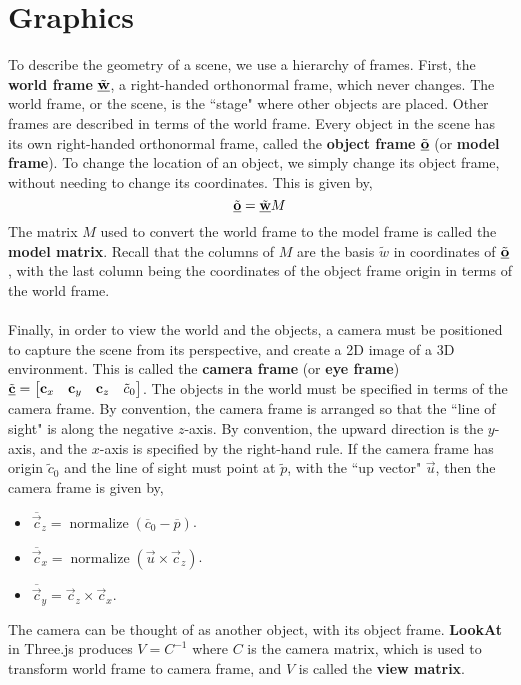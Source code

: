 \documentclass[letterpaper,12pt]{article}
\begin{document}
\section*{Graphics}
To describe the geometry of a scene, we use a hierarchy of frames. First, the \textbf{world frame} $\tilde{\underline{\mathbf{w}}}$, a right-handed orthonormal frame, which never changes. The world frame, or the scene, is the ``stage" where other objects are placed. Other frames are described in terms of the world frame. Every object in the scene has its own right-handed orthonormal frame, called the \textbf{object frame} $\tilde{\underline{\mathbf{o}}}$ (or \textbf{model frame}). To change the location of an object, we simply change its object frame, without needing to change its coordinates. This is given by,
\begin{equation*}
    \tilde{\underline{\mathbf{o}}} = \tilde{\underline{\mathbf{w}}} M
\end{equation*}
The matrix $M$ used to convert the world frame to the model frame is called the \textbf{model matrix}. Recall that the columns of $M$ are the basis $\tilde{w}$ in coordinates of $\tilde{\underline{\mathbf{o}}}$, with the last column being the coordinates of the object frame origin in terms of the world frame.
\\ \\ Finally, in order to view the world and the objects, a camera must be positioned to capture the scene from its perspective, and create a 2D image of a 3D environment. This is called the \textbf{camera frame} (or \textbf{eye frame}) $\tilde{\underline{\mathbf{c}}} = \begin{bmatrix} \mathbf{c}_x & \mathbf{c}_y & \mathbf{c}_z & \tilde{c}_0 \end{bmatrix}$. The objects in the world must be specified in terms of the camera frame. By convention, the camera frame is arranged so that the ``line of sight" is along the negative $z$-axis. By convention, the upward direction is the $y$-axis, and the $x$-axis is specified by the right-hand rule. If the camera frame has origin $\tilde{c}_0$ and the line of sight must point at $\tilde{p}$, with the ``up vector" $\vec{u}$, then the camera frame is given by,
\begin{itemize}
    \item $\overline{\vec{c}}_z = \operatorname{normalize}(\overline{c}_0 - \overline{p})$.
    \item $\overline{\vec{c}}_x = \operatorname{normalize}(\vec{u} \times \vec{c}_z)$.
    \item $\overline{\vec{c}}_y = \vec{c}_z \times \vec{c}_x$.
\end{itemize}
The camera can be thought of as another object, with its object frame. \textbf{LookAt} in Three.js produces $V = C^{-1}$ where $C$ is the camera matrix, which is used to transform world frame to camera frame, and $V$ is called the \textbf{view matrix}.
\end{document}
